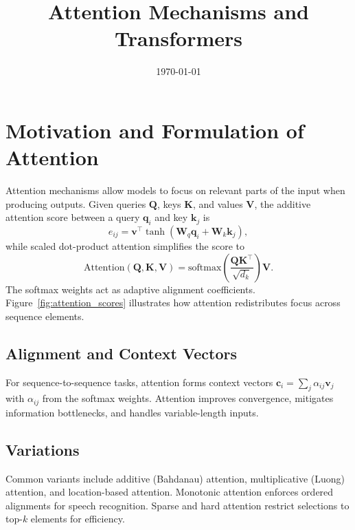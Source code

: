 ﻿\documentclass[12pt]{article}
\title{Attention Mechanisms and Transformers}
\author{}
\date{\today}
\begin{document}
\maketitle

\section{Motivation and Formulation of Attention}
Attention mechanisms allow models to focus on relevant parts of the input when producing outputs. Given queries $\mathbf{Q}$, keys $\mathbf{K}$, and values $\mathbf{V}$, the additive attention score between a query $\mathbf{q}_i$ and key $\mathbf{k}_j$ is
\begin{equation}
  e_{ij} = \mathbf{v}^{\top} \tanh(\mathbf{W}_q \mathbf{q}_i + \mathbf{W}_k \mathbf{k}_j),
\end{equation}
while scaled dot-product attention simplifies the score to
\begin{equation}
  \mathrm{Attention}(\mathbf{Q}, \mathbf{K}, \mathbf{V}) = \mathrm{softmax}\left( \frac{\mathbf{Q} \mathbf{K}^{\top}}{\sqrt{d_k}} \right) \mathbf{V}.
\end{equation}
The softmax weights act as adaptive alignment coefficients. Figure~\ref{fig:attention_scores} illustrates how attention redistributes focus across sequence elements.

\subsection{Alignment and Context Vectors}
For sequence-to-sequence tasks, attention forms context vectors $\mathbf{c}_i = \sum_j \alpha_{ij} \mathbf{v}_j$ with $\alpha_{ij}$ from the softmax weights. Attention improves convergence, mitigates information bottlenecks, and handles variable-length inputs.

\subsection{Variations}
Common variants include additive (Bahdanau) attention, multiplicative (Luong) attention, and location-based attention. Monotonic attention enforces ordered alignments for speech recognition. Sparse and hard attention restrict selections to top-$k$ elements for efficiency.
\end{document}
